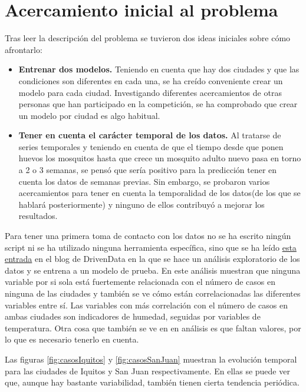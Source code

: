 \documentclass[acmtog, screen]{acmart}
\begin{document}
\section{Acercamiento inicial al problema}
Tras leer la descripción del problema se tuvieron dos ideas iniciales sobre cómo afrontarlo:
\begin{itemize}
	\item \textbf{Entrenar dos modelos.} Teniendo en cuenta que hay dos ciudades y que las condiciones son diferentes en cada una, se ha creído conveniente crear un modelo para cada ciudad. Investigando diferentes acercamientos de otras personas que han participado en la competición, se ha comprobado que crear un modelo por ciudad es algo habitual.
	\item \textbf{Tener en cuenta el carácter temporal de los datos.} Al tratarse de series temporales y teniendo en cuenta de que el tiempo desde que ponen huevos los mosquitos hasta que crece un mosquito adulto nuevo pasa en torno a 2 o 3 semanas, se pensó que sería positivo para la predicción tener en cuenta los datos de semanas previas. Sin embargo, se probaron varios acercamientos para tener en cuenta la temporalidad de los datos(de los que se hablará posteriormente) y ninguno de ellos contribuyó a mejorar los resultados.
\end{itemize}

Para tener una primera toma de contacto con los datos no se ha escrito ningún script ni se ha utilizado ninguna herramienta específica, sino que se ha leído \href{http://drivendata.co/blog/dengue-benchmark/}{esta entrada} en el blog de DrivenData en la que se hace un análisis exploratorio de los datos y se entrena a un modelo de prueba. En este análisis muestran que ninguna variable por si sola está fuertemente relacionada con el número de casos en ninguna de las ciudades y también se ve cómo están correlacionadas las diferentes variables entre sí. Las variables con más correlación con el número de casos en ambas ciudades son indicadores de humedad, seguidas por variables de temperatura. Otra cosa que también se ve en en análisis es que faltan valores, por lo que es necesario tenerlo en cuenta.

Las figuras \ref{fig:casosIquitos} y \ref{fig:casosSanJuan} muestran la evolución temporal para las ciudades de Iquitos y San Juan respectivamente. En ellas se puede ver que, aunque hay bastante variabilidad, también tienen cierta tendencia periódica.
\end{document}
